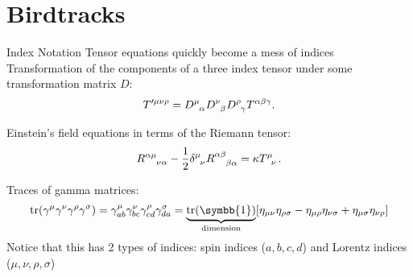 \documentclass{beamer}
\DeclareMathOperator{\tr}{tr}
\newcommand{\identityMatrix}{\symbb{1}}
\newcommand{\minkowskiMetric}{\eta}
\begin{document}
    \section{Birdtracks}
    \begin{frame}{Index Notation}
        Tensor equations quickly become a mess of indices
        \pause
        Transformation of the components of a three index tensor under some transformation matrix \(D\):
        \begin{equation*}
            T'^{\mu\nu\rho} = \tensor{D}{^\mu_\alpha}\tensor{D}{^\nu_\beta}\tensor{D}{^\rho_\gamma}T^{\alpha\beta\gamma}.
        \end{equation*}
        
        \pause
        Einstein's field equations in terms of the Riemann tensor:
        \begin{equation*}
            \tensor{R}{^{\alpha\mu}_{\nu\alpha}} - \frac{1}{2}\tensor{\delta}{^\mu_\nu}\tensor{R}{^{\alpha\beta}_{\beta\alpha}} = \kappa \tensor{T}{^\mu_\nu}.
        \end{equation*}
         
        \pause
        Traces of gamma matrices:
        \begin{equation*}
            \tr(\gamma^\mu \gamma^\nu \gamma^\rho \gamma^\sigma) = \gamma^{\mu}_{ab}\gamma^\nu_{bc}\gamma^\rho_{cd}\gamma^\sigma_{da} = \underbrace{\tr(\identityMatrix)}_{\text{dimension}} [\minkowskiMetric_{\mu\nu}\minkowskiMetric_{\rho\sigma} - \minkowskiMetric_{\mu\rho}\minkowskiMetric_{\nu\sigma} + \minkowskiMetric_{\mu\sigma}\minkowskiMetric_{\nu\rho}]
        \end{equation*}
        Notice that this has 2 types of indices: spin indices (\(a, b, c, d\)) and Lorentz indices (\(\mu, \nu, \rho, \sigma\))
    \end{frame}
    
\end{document}
